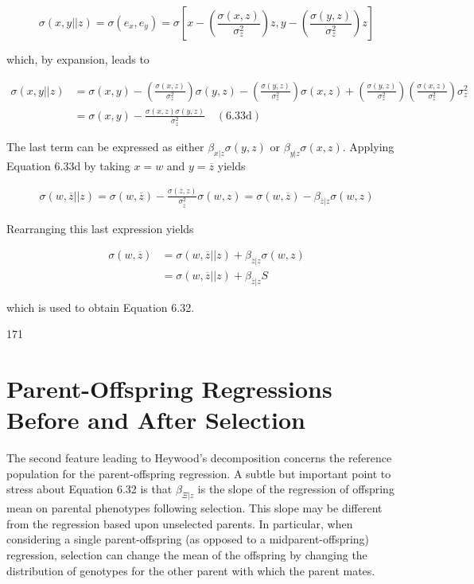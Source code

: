 \documentclass{article}
\begin{document}
\begin{equation}
\sigma(x,y||z)=\sigma(e_{x},e_{y})=\sigma\left[x-\left(\frac{\sigma(x,z)}{\sigma_{z}^{2}}\right)z,y-\left(\frac{\sigma(y,z)}{\sigma_{z}^{2}}\right)z\right]
\end{equation}

which, by expansion, leads to

\begin{equation}
\begin{aligned}\sigma(x,y||z)&=\sigma(x,y)-\left(\frac{\sigma(x,z)}{\sigma_{z}^{2}}\right)\sigma(y,z)-\left(\frac{\sigma(y,z)}{\sigma_{z}^{2}}\right)\sigma(x,z)+\left(\frac{\sigma(y,z)}{\sigma_{z}^{2}}\right)\left(\frac{\sigma(x,z)}{\sigma_{z}^{2}}\right)\sigma_{z}^{2}\\&=\sigma(x,y)-\frac{\sigma(x,z)\sigma(y,z)}{\sigma_{z}^{2}}\quad(6.33\mathrm{d})\end{aligned}
\end{equation}

The last term can be expressed as either  $ \beta_{x|z}\sigma(y,z) $ or  $ \beta_{y|z}\sigma(x,z) $. Applying Equation 6.33d by taking  $ x = w $ and  $ y = \overline{z} $ yields

\begin{equation}
\begin{align*}\sigma(w,\overline{z}||z)=\sigma(w,\overline{z})-\frac{\sigma(\overline{z},z)}{\sigma_{\overline{z}}^2}\sigma(w,z)=\sigma(w,\overline{z})-\beta_{\overline{z}|z}\sigma(w,z)\end{align*}
\tag{6.33e}
\label{eq:6_33e}
\end{equation}

Rearranging this last expression yields

\begin{equation}
\begin{aligned}\sigma(w,\overline{z})&=\sigma(w,\overline{z}||z)+\beta_{\overline{z}|z}\sigma(w,z)\\&=\sigma(w,\overline{z}||z)+\beta_{\overline{z}|z}S\end{aligned}
\tag{6.33f}
\label{eq:6_33f}
\end{equation}

which is used to obtain Equation 6.32.

171

\section{Parent-Offspring Regressions Before and After Selection}
The second feature leading to Heywood’s decomposition concerns the reference population for the parent-offspring regression. A subtle but important point to stress about Equation 6.32 is that  $ \beta_{\Xi|z} $ is the slope of the regression of offspring mean on parental phenotypes following selection. This slope may be different from the regression based upon unselected parents. In particular, when considering a single parent-offspring (as opposed to a midparent-offspring) regression, selection can change the mean of the offspring by changing the distribution of genotypes for the other parent with which the parent mates.
\end{document}
